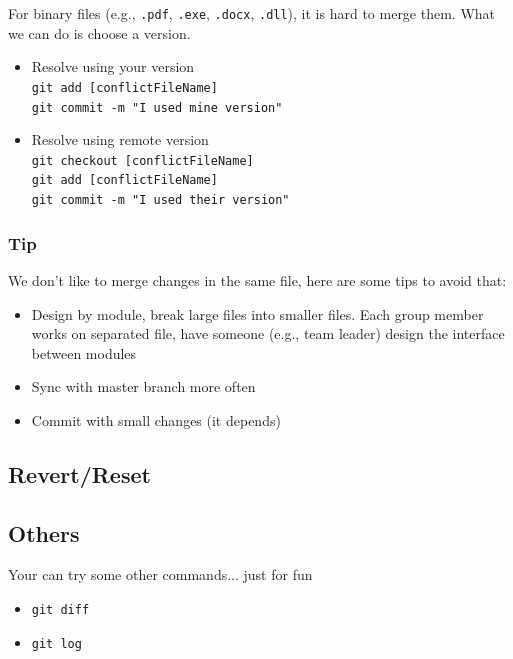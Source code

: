 \documentclass{beamer}
\begin{document}
			\begin{frame}
				For binary files (e.g., \texttt{.pdf}, \texttt{.exe}, \texttt{.docx}, \texttt{.dll}), it is hard to merge them. What we can do is choose a version.
				\begin{itemize}
					\item Resolve using your version\\
						\texttt{git add [conflictFileName]}\\
						\texttt{git commit -m "I used mine version"}
					\item Resolve using remote version\\
						\texttt{git checkout [conflictFileName]}\\
						\texttt{git add [conflictFileName]}\\
						\texttt{git commit -m "I used their version"}
				\end{itemize}
			\end{frame}

			\begin{frame}
				\frametitle{Tip}
				We don't like to merge changes in the same file, here are some tips to avoid that:
				\begin{itemize}
					\item Design by module, break large files into smaller files. Each group member works on separated file, have someone (e.g., team leader) design the interface between modules
					\item Sync with master branch more often
					\item Commit with small changes (it depends)
				\end{itemize}
			\end{frame}
		\subsection{Revert/Reset}

		\subsection{Others}
			Your can try some other commands... just for fun
			\begin{itemize}
				\item \texttt{git diff}
				\item \texttt{git log}
			\end{itemize}
\end{document}
